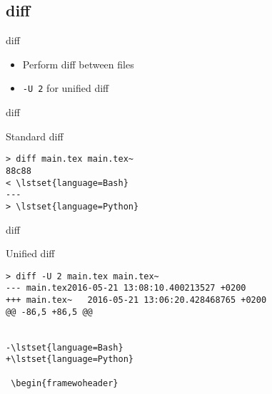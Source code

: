 \subsection{diff}

\begin{frame}[fragile]{diff}
  \begin{itemize}
    \pause \item Perform diff between files
    \pause \item \texttt{-U 2} for unified diff
  \end{itemize}
\end{frame}

\begin{frame}[fragile]{diff}
  \begin{exampleblock}{Standard diff}
    \begin{lstlisting}[showstringspaces=false,basicstyle=\tiny]
> diff main.tex main.tex~
88c88
< \lstset{language=Bash}
---
> \lstset{language=Python}
    \end{lstlisting}
  \end{exampleblock}
  \pause
\end{frame}

\begin{frame}[fragile]{diff}
  \begin{exampleblock}{Unified diff}
    \begin{lstlisting}[showstringspaces=false,basicstyle=\tiny]
> diff -U 2 main.tex main.tex~
--- main.tex2016-05-21 13:08:10.400213527 +0200
+++ main.tex~   2016-05-21 13:06:20.428468765 +0200
@@ -86,5 +86,5 @@
 
 
-\lstset{language=Bash}
+\lstset{language=Python}
 
 \begin{framewoheader}
    \end{lstlisting}
  \end{exampleblock}
\end{frame}

